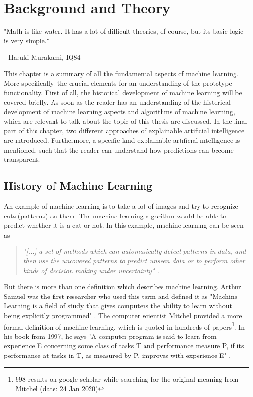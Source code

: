 \chapter{Background and Theory}
\label{ch:theory}
\epigraph{"Math is like water. It has a lot of difficult theories, of course, but its basic logic is very simple."}{- Haruki Murakami, IQ84}

This chapter is a summary of all the fundamental aspects of machine learning. More specifically, the crucial elements for an understanding of the prototype-functionality. First of all, the historical development of machine learning will be covered briefly. As soon as the reader has an understanding of the historical development of machine learning aspects and algorithms of machine learning, which are relevant to talk about the topic of this thesis are discussed. In the final part of this chapter, two different approaches of explainable artificial intelligence are introduced. Furthermore, a specific kind 
explainable artificial intelligence is mentioned, such that the reader can understand how predictions can become transparent.

\section{History of Machine Learning}
\label{sec:history}

An example of machine learning is to take a lot of images and try to recognize cats (patterns) on them. The machine learning algorithm would be able to predict whether it is a cat or not. In this example, machine learning can be seen as

\begin{quote}\textit{"[...] a set of methods which can automatically detect patterns in data, and then use the uncovered patterns to predict unseen data or to perform other kinds of decision making under uncertainty" \cite[p. 1]{Murphy2012}.} \end{quote}

But there is more than one definition which describes machine learning. Arthur Samuel was the first researcher who used this term and defined it as "Machine Learning is a field of study that gives computers the ability to learn without being explicitly programmed" \cite{Samuel1959SomeSI}. The computer scientist Mitchel provided a more formal definition of machine learning, which is quoted in hundreds of papers\footnote{998 results on google scholar while searching for the original meaning from Mitchel (date: 24 Jan 2020)}. In his book from 1997, he says "A computer program is said to learn from experience E concerning some class of tasks T and performance measure P, if its performance at tasks in T, as measured by P, improves with experience E" \cite{Mitchell97}.\\

